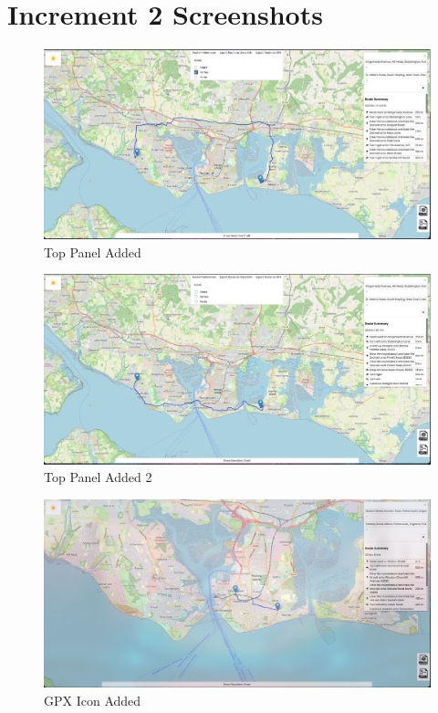 \chapter{Increment 2 Screenshots}

\begin{figure}[!ht]
    \centering
    \includegraphics[width=425px]{figures/Progress Images/Iteration-1/SR7/SR9 Top Panel added and Avoid functionality implemented Avoid Ferries Example.png}
    \caption{Top Panel Added}
\end{figure}

\begin{figure}[!ht]
    \centering
    \includegraphics[width=425px]{figures/Progress Images/Iteration-1/SR7/SR9 Top Panel added and Avoid functionality implemented.png}
    \caption{Top Panel Added 2}
\end{figure}

\begin{figure}[!ht]
    \centering
    \includegraphics[width=425px]{figures/Progress Images/Iteration-1/SR12/SR13 GPX Icon Added (bottom right).png}
    \caption{GPX Icon Added}
\end{figure}

